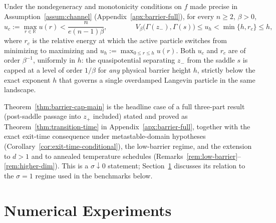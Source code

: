 \documentclass{opt2026} %
\newcommand{\R}{\mathbb{R}}
\begin{document}
\begin{theorem}
    \label{thm:barrier-cap-main}
    Under the nondegeneracy and monotonicity conditions on $f$ made precise in Assumption~\ref{assum:channel} (Appendix~\ref{apx:barrier-full}), for every $n\ge2$, $\beta>0$,
    \begin{equation}
        u_c:=\max_{r\in\R}u(r)<\frac{n}{e(n-1)\beta}, \qquad\qquad V_\beta\bigl(\Gamma(z_-),\Gamma(s)\bigr)\le u_h<\min\{h,r_c\}\le h,
        \label{eq:barrier-cap}
    \end{equation}
    where $r_c$ is the relative energy at which the active particle switches from minimizing to maximizing and $u_h:=\max_{0\le r\le h}u(r)$. Both $u_c$ and $r_c$ are of order $\beta^{-1}$, uniformly in $h$: the quasipotential separating $z_-$ from the saddle $s$ is capped at a level of order $1/\beta$ for \emph{any} physical barrier height $h$, strictly below the exact exponent $h$ that governs a single overdamped Langevin particle in the same landscape.
\end{theorem}

Theorem~\ref{thm:barrier-cap-main} is the headline case of a full three-part result (post-saddle passage into $z_+$ included) stated and proved as Theorem~\ref{thm:transition-time} in Appendix~\ref{apx:barrier-full}, together with the exact exit-time consequence under metastable-domain hypotheses (Corollary~\ref{cor:exit-time-conditional}), the low-barrier regime, and the extension to $d>1$ and to annealed temperature schedules (Remarks~\ref{rem:low-barrier}--\ref{rem:higher-dim}). This is a $\sigma\downarrow0$ statement; Section~\ref{sec:numerical-experiments} discusses its relation to the $\sigma=1$ regime used in the benchmarks below.

\section{Numerical Experiments}
\label{sec:numerical-experiments}
\end{document}
